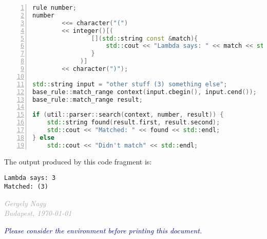 \documentclass[12pt]{article}
\begin{document}
\begin{center}
	\begin{minipage}[h]{0.7\textwidth}
		\begin{lstlisting}[language=c++, breaklines=true, numbers=left]
rule number;
number
		<<= character("(") 
		<< integer()[(
				[](std::string const &match){
					std::cout << "Lambda says: " << match << std::endl;
				}
			 )] 
		<< character(")");

std::string input = "other stuff (3) something else";
base_rule::match_range context(input.cbegin(), input.cend());
base_rule::match_range result;

if (util::parser::search(context, number, result)) {
	std::string found(result.first, result.second);
	std::cout << "Matched: " << found << std::endl;
} else
	std::cout << "Didn't match" << std::endl;
		\end{lstlisting}
	\end{minipage}
\end{center}

The output produced by this code fragment is:
\begin{center}
	\begin{minipage}[ht]{0.2\textwidth}
		\begin{lstlisting}[breaklines=true]
Lambda says: 3
Matched: (3)
		\end{lstlisting}
	\end{minipage}
\end{center}


\vfill
\vfill
\vfill
\hfill\begin{minipage}[h]{0.4\textwidth}
\begin{center}
	\itshape\textcolor{darkgray}{
		Gergely Nagy\\
		Budapest, \today
	}
\end{center}
\end{minipage}
\vfill

\newpage \tableofcontents
{}

\vfill
\vfill
\begin{center}
\textcolor{darkblue}{\footnotesize\emph{Please consider the environment before printing this document.}}
\end{center}
\vfill
\end{document}
